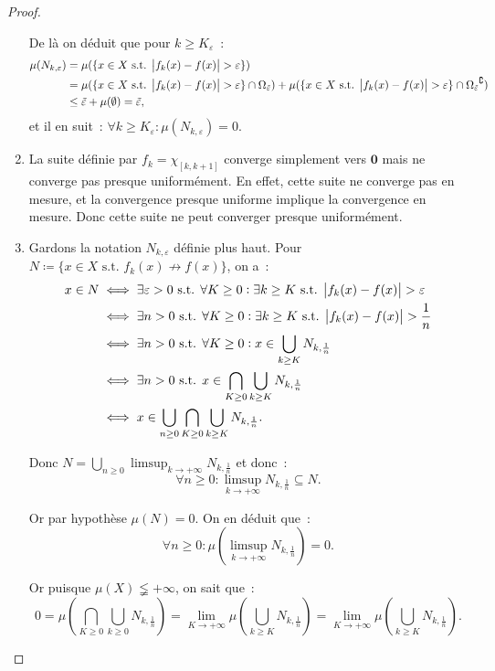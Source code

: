 \documentclass{article}
\theoremstyle{definition}
\newcommand{\pinfty}{{+\infty}}
\newcommand{\st}{\text{ s.t. }}
\newcommand{\C}{\complement}
\begin{document}
\begin{proof}
\begin{enumerate}
	De là on déduit que pour $k \geq K_\varepsilon$~:
	\begin{align*}
		\mu(N_{k,\varepsilon}) &= \mu(\{x \in X \st \abs {f_k(x)-f(x)} > \varepsilon\}) \\
		&= \mu(\{x \in X \st \abs {f_k(x)-f(x)} > \varepsilon\} \cap \Omega_{\tilde \varepsilon})
			+ \mu(\{x \in X \st \abs {f_k(x)-f(x)} > \varepsilon\} \cap {\Omega_{\tilde \varepsilon}}^\C) \\
		&\leq \tilde \varepsilon + \mu(\emptyset) = \tilde \varepsilon,
	\end{align*}
	et il en suit~: $\forall k \geq K_\varepsilon : \mu(N_{k,\varepsilon}) = 0$.

	\item La suite définie par $f_k = \chi_{[k, k+1]}$ converge simplement vers $\mathbf 0$ mais ne converge pas presque uniformément. En effet, cette suite ne converge pas en mesure,
	et la convergence presque uniforme implique la convergence en mesure. Donc cette suite ne peut converger presque uniformément.

	\item Gardons la notation $N_{k,\varepsilon}$ définie plus haut. Pour $N \coloneqq \{x \in X \st f_k(x) \not \to f(x)\}$, on a~:
	\begin{align*}
		x \in N &\iff \exists \varepsilon > 0 \st \forall K \geq 0 : \exists k \geq K \st \abs {f_k(x)-f(x)} > \varepsilon \\
		&\iff \exists n > 0 \st \forall K \geq 0 : \exists k \geq K \st \abs {f_k(x)-f(x)} > \frac 1n \\
		&\iff \exists n > 0 \st \forall K \geq 0 : x \in \bigcup_{k \geq K}N_{k,\frac 1n} \\
		&\iff \exists n > 0 \st x \in \bigcap_{K \geq 0}\bigcup_{k \geq K}N_{k,\frac 1n} \\
		&\iff x \in \bigcup_{n \geq 0} \bigcap_{K \geq 0}\bigcup_{k \geq K}N_{k,\frac 1n}.
	\end{align*}

	Donc $N = \bigcup_{n \geq 0}\limsup_{k \to \pinfty}N_{k,\frac 1n}$ et donc~:
	\[\forall n \geq 0 : \limsup_{k \to \pinfty}N_{k,\frac 1n} \subseteq N.\]

	Or par hypothèse $\mu(N) = 0$. On en déduit que~:
	\[\forall n \geq 0 : \mu(\limsup_{k \to \pinfty}N_{k,\frac 1n}) = 0.\]

	Or puisque $\mu(X) \lneqq \pinfty$, on sait que~:
	\[0 = \mu\left(\bigcap_{K \geq 0}\bigcup_{k \geq 0}N_{k,\frac 1n}\right) = \lim_{K \to \pinfty}\mu\left(\bigcup_{k \geq K}N_{k,\frac 1n}\right)
	= \lim_{K \to \pinfty}\mu\left(\bigcup_{k \geq K}N_{k,\frac 1n}\right).\]


\end{enumerate}
\end{proof}
\end{document}
